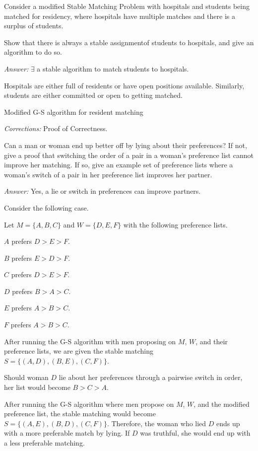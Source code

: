 \documentclass[12pt]{article}
\newenvironment{problem}[2][Problem]{\begin{trivlist}
\item[\hskip \labelsep {\bfseries #1}\hskip \labelsep {\bfseries #2.}]}{\end{trivlist}}
\begin{document}
\begin{problem}{3}
Consider a modified Stable Matching Problem with hospitals and students being matched for residency, where hospitals have multiple matches and there is a surplus of students.

Show that there is always a stable assignmentof students to hospitals, and give an algorithm to do so.
\end{problem}

\textit{Answer: } $\exists$ a stable algorithm to match students to hospitals.

Hospitals are either full of residents or have open positions available. Similarly, students are either committed or open to getting matched.

\begin{algorithm}
\caption{Modified G-S algorithm for resident matching}
\begin{algorithmic}
		\Else
		\EndIf
	\EndIf
\EndWhile
\end{algorithmic}
\end{algorithm}
\textit{Corrections:} Proof of Correctness.

\begin{problem}{4}
Can a man or woman end up better off by lying about their preferences? If not, give a proof that switching the order of a pair in a woman's preference list cannot improve her matching. If so, give an example set of preference lists where a woman's switch of a pair in her preference list improves her partner.
\end{problem}
\newpage
\textit{Answer: } Yes, a lie or switch in preferences can improve partners.

Consider the following case.

Let $M = \{A, B, C\}$ and $W = \{D, E, F\}$ with the following preference lists.

$A$ prefers $D > E > F$.

$B$ prefers $E > D > F$.

$C$ prefers $D > E > F$.

$D$ prefers $B > A > C$.

$E$ prefers $A > B > C$.

$F$ prefers $A > B > C$.

After running the G-S algorithm with men proposing on $M$, $W$, and their preference lists, we are given the stable matching $S = \{(A,D),(B,E),(C,F)\}$.

Should woman $D$ lie about her preferences through a pairwise switch in order, her list would become $B > C > A$.

After running the G-S algorithm where men propose on $M$, $W$, and the modified preference list, the stable matching would become $S = \{(A,E),(B,D),(C,F)\}$. Therefore, the woman who lied $D$ ends up with a more preferable match by lying. If $D$ was truthful, she would end up with a less preferable matching. 
\end{document}

